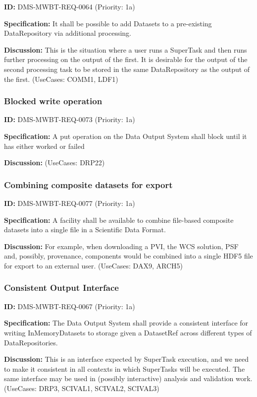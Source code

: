 \documentclass[SE,toc,lsstdraft]{lsstdoc}
\begin{document}
\label{DMS-MWBT-REQ-0064}
\textbf{ID:} DMS-MWBT-REQ-0064 (Priority: 1a)

\textbf{Specification:}
It shall be possible to add Datasets to a pre-existing DataRepository via additional processing.

\textbf{Discussion:}
This is the situation where a user runs a SuperTask and then runs further processing on the output of the first. It is desirable for the output of the second processing task to be stored in the same DataRepository as the output of the first. (UseCases: COMM1, LDF1)

\subsubsection{Blocked write operation}

\label{DMS-MWBT-REQ-0073}
\textbf{ID:} DMS-MWBT-REQ-0073 (Priority: 1a)

\textbf{Specification:}
A put operation on the Data Output System shall block until it has either worked or failed

\textbf{Discussion:}
(UseCases: DRP22)

\subsubsection{Combining composite datasets for export}

\label{DMS-MWBT-REQ-0077}
\textbf{ID:} DMS-MWBT-REQ-0077 (Priority: 1a)

\textbf{Specification:}
A facility shall be available to combine file-based composite datasets into a single file in a Scientific Data Format.

\textbf{Discussion:}
For example, when downloading a PVI, the WCS solution, PSF and, possibly, provenance, components would be combined into a single HDF5 file for export to an external user. (UseCases: DAX9, ARCH5)

\subsubsection{Consistent Output Interface}

\label{DMS-MWBT-REQ-0067}
\textbf{ID:} DMS-MWBT-REQ-0067 (Priority: 1a)

\textbf{Specification:}
The Data Output System shall provide a consistent interface for writing InMemoryDatasets to storage given a DatasetRef across different types of DataRepositories.

\textbf{Discussion:}
This is an interface expected by SuperTask execution, and we need to make it consistent in all contexts in which SuperTasks will be executed. The same interface may be used in (possibly interactive) analysis and validation work. (UseCases: DRP3, SCIVAL1, SCIVAL2, SCIVAL3)
\end{document}
